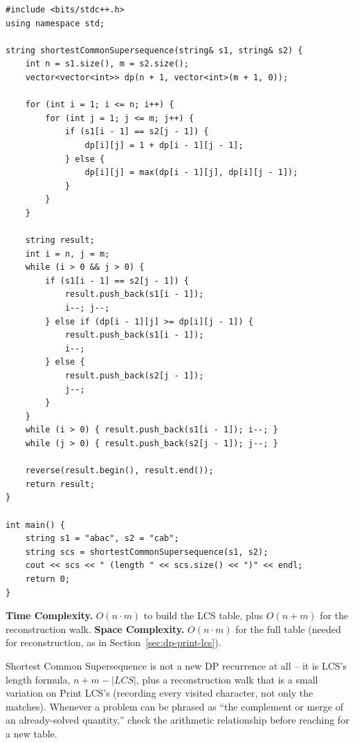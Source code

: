 \begin{lstlisting}
#include <bits/stdc++.h>
using namespace std;

string shortestCommonSupersequence(string& s1, string& s2) {
    int n = s1.size(), m = s2.size();
    vector<vector<int>> dp(n + 1, vector<int>(m + 1, 0));

    for (int i = 1; i <= n; i++) {
        for (int j = 1; j <= m; j++) {
            if (s1[i - 1] == s2[j - 1]) {
                dp[i][j] = 1 + dp[i - 1][j - 1];
            } else {
                dp[i][j] = max(dp[i - 1][j], dp[i][j - 1]);
            }
        }
    }

    string result;
    int i = n, j = m;
    while (i > 0 && j > 0) {
        if (s1[i - 1] == s2[j - 1]) {
            result.push_back(s1[i - 1]);
            i--; j--;
        } else if (dp[i - 1][j] >= dp[i][j - 1]) {
            result.push_back(s1[i - 1]);
            i--;
        } else {
            result.push_back(s2[j - 1]);
            j--;
        }
    }
    while (i > 0) { result.push_back(s1[i - 1]); i--; }
    while (j > 0) { result.push_back(s2[j - 1]); j--; }

    reverse(result.begin(), result.end());
    return result;
}

int main() {
    string s1 = "abac", s2 = "cab";
    string scs = shortestCommonSupersequence(s1, s2);
    cout << scs << " (length " << scs.size() << ")" << endl;
    return 0;
}
\end{lstlisting}

\begin{complexitybox}
\textbf{Time Complexity.} $O(n \cdot m)$ to build the LCS table, plus
$O(n+m)$ for the reconstruction walk.
\textbf{Space Complexity.} $O(n \cdot m)$ for the full table (needed for
reconstruction, as in Section~\ref{sec:dp-print-lcs}).
\end{complexitybox}

\begin{takeawaybox}
Shortest Common Supersequence is not a new DP recurrence at all -- it is
LCS's length formula, $n+m-|\textit{LCS}|$, plus a reconstruction walk
that is a small variation on Print LCS's (recording every visited
character, not only the matches). Whenever a problem can be phrased as
``the complement or merge of an already-solved quantity,'' check the
arithmetic relationship before reaching for a new table.
\end{takeawaybox}
